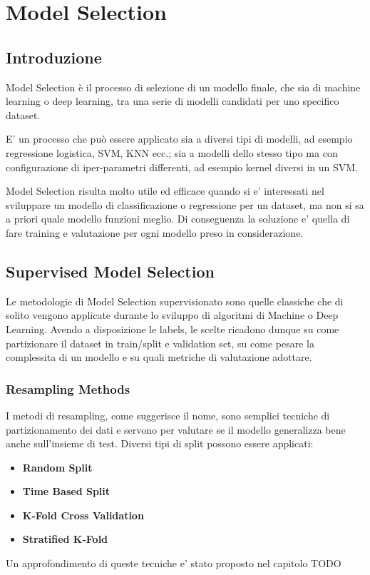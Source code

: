 \chapter{Model Selection}

\section{Introduzione}
Model Selection è il processo di selezione di un modello finale, che sia di machine learning o deep learning, tra una serie di modelli candidati per uno specifico dataset.

E' un processo che può essere applicato sia a diversi tipi di modelli, ad esempio regressione logistica, SVM, KNN ecc.; sia a modelli dello stesso tipo ma con configurazione di iper-parametri differenti, ad esempio kernel diversi in un SVM.

Model Selection risulta molto utile ed efficace quando si e' interessati nel sviluppare un modello di classificazione o regressione per un dataset, ma non si sa a priori quale modello funzioni meglio. Di conseguenza la soluzione e' quella di fare training e valutazione per ogni modello preso in considerazione.




\section{Supervised Model Selection}
Le metodologie di Model Selection supervisionato sono quelle classiche che di solito vengono applicate durante lo sviluppo di algoritmi di Machine o Deep Learning. Avendo a disposizione le labels, le scelte ricadono dunque su come partizionare il dataset in train/split e validation set, su come pesare la complessita di un modello e su quali metriche di valutazione adottare.

\subsection{Resampling Methods}
I metodi di resampling, come suggerisce il nome, sono semplici tecniche di partizionamento dei dati e servono per valutare se il modello generalizza bene anche sull'insieme di test. Diversi tipi di split possono essere applicati:
\begin{itemize}
	\item \textbf{Random Split}
	\item \textbf{Time Based Split} 
	\item \textbf{K-Fold Cross Validation}
	\item \textbf{Stratified K-Fold}
\end{itemize}
Un approfondimento di queste tecniche e' stato proposto nel capitolo TODO

